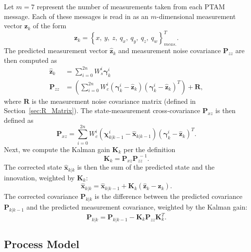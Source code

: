 Let $m = 7$ represent the number of measurements taken from each PTAM message. Each of these messages is read in as an $m$-dimensional measurement vector $\mathbf{z}_{k}$ of the form
%
\begin{equation}
\mathbf{z}_{k} = \left\lbrace x,\ y,\ z,\ q_{x},\ q_{y},\ q_{z},\ q_{w} \right\rbrace ^{T} _{meas.} .
\end{equation}
%
The predicted measurement vector $\hat{\mathbf{z}}_{k}$ and measurement noise covariance $\mathbf{P}_{zz}$ are then computed as
%
\begin{align}
\hat{\mathbf{z}}_{k} &= \sum^{2n}_{i=0} W^{i}_{s} \bm{\gamma}^{i}_{k} \\
\mathbf{P}_{zz} &= \left( \sum^{2n}_{i=0} W^{i}_{c} \left( \bm{\gamma}^{i}_{k} - \hat{\mathbf{z}}_{k} \right) \left( \bm{\gamma}^{i}_{k} - \hat{\mathbf{z}}_{k} \right)^{T} \right) + \mathbf{R},
\end{align}
%
where $\mathbf{R}$ is the measurement noise covariance matrix (defined in Section~\ref{sec:R_Matrix}). The state-measurement cross-covariance $\mathbf{P}_{xz}$ is then defined as
%
\begin{equation}
\mathbf{P}_{xz} = \sum^{2n}_{i=0} W^{i}_{c} \left( \bm{\chi}^{i}_{k | k-1} - \hat{\mathbf{x}}_{k | k-1} \right) \left( \bm{\gamma}^{i}_{k} - \hat{\mathbf{z}}_{k} \right)^{T} .
\end{equation}
%
Next, we compute the Kalman gain $\mathbf{K}_{k}$ per the definition
%
\begin{equation}
\mathbf{K}_{k} = \mathbf{P}_{xz} \mathbf{P}^{\,-1}_{zz}.
\end{equation}
%
The corrected state $\hat{\mathbf{x}}_{k | k}$ is then the sum of the predicted state and the innovation, weighted by $\mathbf{K}_{k}$:
%
\begin{equation}
\hat{\mathbf{x}}_{k | k} = \hat{\mathbf{x}}_{k | k-1} + \mathbf{K}_{k} \left( \hat{\mathbf{z}}_{k} - \mathbf{z}_{k} \right) .
\end{equation}
%
The corrected covariance $\mathbf{P}_{k | k}$ is the difference between the predicted covariance $\mathbf{P}_{k | k-1}$ and the predicted measurement covariance, weighted by the Kalman gain:
%
\begin{equation}
\mathbf{P}_{k | k} = \mathbf{P}_{k | k-1} - \mathbf{K}_{k} \mathbf{P}_{zz} \mathbf{K}_{k}^{T} .
\end{equation}

\subsection{Process Model} \label{Process_Model}

